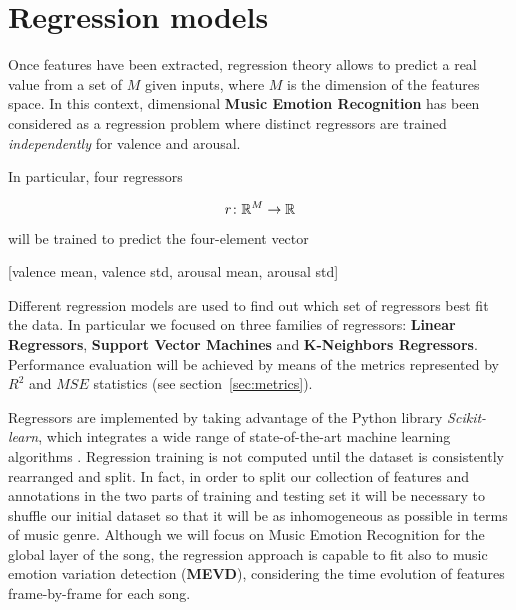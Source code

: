 \section{Regression models}\label{sec:regression}

Once features have been extracted, regression theory allows to predict a real value from a set of $M$ given inputs, where $M$ is the dimension of the features space.
In this context, dimensional \textbf{Music Emotion Recognition} has been considered as a regression problem where distinct regressors are trained \textit{independently} for valence and arousal. 

In particular, four regressors

\[
	r \colon \mathbb{R}^{M} \to \mathbb{R}
\]

will be trained to predict the four-element vector

\begin{center}
	[valence mean, valence std, arousal mean, arousal std]
\end{center}

Different regression models are used to find out which set of regressors best fit the data. In particular we focused on three families of regressors: \textbf{Linear Regressors}, \textbf{Support Vector Machines} and \textbf{K-Neighbors Regressors}. Performance evaluation will be achieved by means of the metrics represented by $R^2$ and $MSE$ statistics (see section~\ref{sec:metrics}).

Regressors are implemented by taking advantage of the Python library \textit{Scikit-learn}, which integrates a wide range of state-of-the-art machine learning algorithms \cite{scikit-learn}.
Regression training is not computed until the dataset is consistently rearranged and split. In fact, in order to split our collection of features and annotations in the two parts of training and testing set it will be necessary to shuffle our initial dataset so that it will be as inhomogeneous as possible in terms of music genre. 
Although we will focus on Music Emotion Recognition for the global layer of the song, the regression approach is capable to fit also to music emotion variation detection (\textbf{MEVD}), considering the time evolution of features frame-by-frame for each song.

